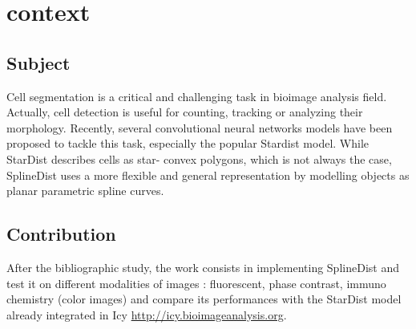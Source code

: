 \documentclass[main.tex]{subfiles}
\begin{document}
\chapter*{context}


\section*{Subject}

Cell segmentation is a critical and challenging task in bioimage analysis field. Actually, cell detection is useful for counting, tracking or analyzing their morphology. Recently, several convolutional neural networks models have been proposed to tackle this task, especially the popular Stardist model. While StarDist describes cells as star- convex polygons, which is not always the case, SplineDist uses a more flexible and general representation by modelling objects as planar parametric spline curves.

\vfill
\section*{Contribution}

After the bibliographic study, the work consists in implementing SplineDist and test it on different modalities of images : fluorescent, phase contrast, immuno chemistry (color images) and compare its performances with the StarDist model already integrated in Icy \url{http://icy.bioimageanalysis.org}.

\vfill
\end{document}
